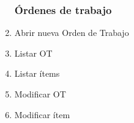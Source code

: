 \documentclass[12pt]{extarticle}
\begin{document}
\begin{spacing}{1.2}
\begin{multicols}{2}
\begin{enumerate}
        \subsubsection*{Órdenes de trabajo}
            \item Abrir nueva Orden de Trabajo
            \item Listar OT
            \item Listar ítems
            \item Modificar OT 
            \item Modificar ítem



\end{enumerate}
\end{multicols}
\end{spacing}
\end{document}
